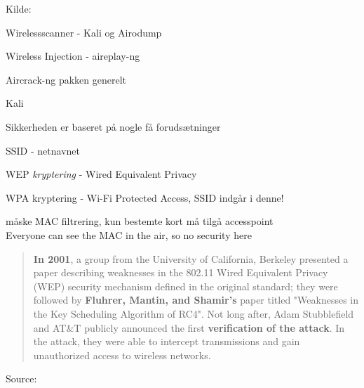\documentclass[Screen16to9,17pt]{foils}
\begin{document}
Kilde: 







\begin{list2}
\item Wirelessscanner - Kali og Airodump
\item Wireless Injection - aireplay-ng
\item Aircrack-ng pakken generelt
\item Kali 
\end{list2}




\begin{list1}
\item Sikkerheden er baseret på nogle få forudsætninger
  \begin{list2}
  \item SSID - netnavnet
  \item WEP \emph{kryptering} - Wired Equivalent Privacy
  \item WPA kryptering - Wi-Fi Protected Access, SSID indgår i denne!
  \item måske MAC filtrering, kun bestemte kort må tilgå accesspoint\\
  Everyone can see the MAC in the air, so no security here
  \end{list2}
\end{list1}



\begin{quote}
{\bf In 2001}, a group from the University of California, Berkeley presented a paper describing weaknesses in the 802.11 Wired Equivalent Privacy (WEP) security mechanism defined in the original standard; they were followed by {\bf Fluhrer, Mantin, and Shamir's} paper titled "Weaknesses in the Key Scheduling Algorithm of RC4". Not long after, Adam Stubblefield and AT\&T publicly announced the first {\bf verification of the attack}. In the attack, they were able to intercept transmissions and gain unauthorized access to wireless networks.
\end{quote}
Source: 
\end{document}
